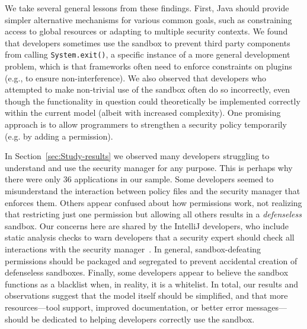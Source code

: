 \documentclass{sig-alternate}
\begin{document}
We take several general lessons from these findings.  First, Java should provide 
simpler alternative mechanisms for various common goals, such as constraining 
access to global resources or adapting to multiple security contexts. 
We found that developers sometimes use the sandbox to prevent third party components from calling
\texttt{System.exit()}, a specific instance of a more general development
problem, which is that frameworks often need to enforce constraints on plugins
(e.g., to ensure non-interference).  We also observed that developers who attempted
to make non-trivial use of the sandbox often do so incorrectly, even though
the functionality in question could theoretically be implemented correctly
within the current model (albeit with increased complexity). 
One promising approach is to allow programmers
to strengthen a security policy temporarily (e.g. by adding a permission). 

In Section~\ref{sec:Study-results} we observed many developers struggling to understand and
use the security manager for any purpose. This is perhaps why there
were only 36 applications in our sample. Some developers seemed to
misunderstand the interaction between policy files and the security
manager that enforces them. Others appear confused
about how permissions work, not realizing that
restricting just one permission but allowing all others results in a
\emph{defenseless} sandbox.  Our concerns here are shared by the IntelliJ developers,
who include static analysis checks to warn developers that a security expert
should check all interactions with the security
manager~\cite{intelliJ}.  In general, sandbox-defeating permissions
should be packaged and segregated to prevent accidental creation of
defenseless sandboxes. Finally, some developers appear to believe
the sandbox functions as a blacklist when, in reality, it is a whitelist.
In total, our results and observations suggest that the model itself should be simplified, and
that more resources---tool support, improved
documentation, or better error messages---should be dedicated to helping
developers correctly use the sandbox.



\end{document}
